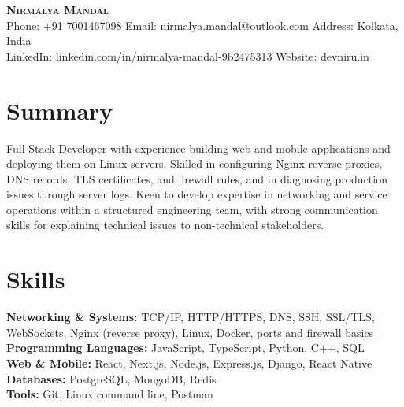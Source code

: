 \documentclass[letterpaper,10pt]{article}
\begin{document}
\begin{center}
    {\Huge \scshape \textbf{Nirmalya Mandal}} \\[6pt]

    \small
    Phone: +91 7001467098 \quad
    Email: nirmalya.mandal@outlook.com \quad
    Address: Kolkata, India \\[4pt]

    LinkedIn: linkedin.com/in/nirmalya-mandal-9b2475313 \quad
    Website: devniru.in
\end{center}

\vspace{-8pt}

\section{Summary}

\small{
Full Stack Developer with experience building web and mobile applications and deploying them on Linux servers. Skilled in configuring Nginx reverse proxies, DNS records, TLS certificates, and firewall rules, and in diagnosing production issues through server logs. Keen to develop expertise in networking and service operations within a structured engineering team, with strong communication skills for explaining technical issues to non-technical stakeholders.
}

\vspace{-4pt}

\section{Skills}

\begin{itemize}[leftmargin=0.15in, label={}]
\small{\item{

\textbf{Networking \& Systems:} TCP/IP, HTTP/HTTPS, DNS, SSH, SSL/TLS, WebSockets, Nginx (reverse proxy), Linux, Docker, ports and firewall basics \\
\textbf{Programming Languages:} JavaScript, TypeScript, Python, C++, SQL \\
\textbf{Web \& Mobile:} React, Next.js, Node.js, Express.js, Django, React Native \\
\textbf{Databases:} PostgreSQL, MongoDB, Redis \\
\textbf{Tools:} Git, Linux command line, Postman

}}
\end{itemize}
\end{document}
